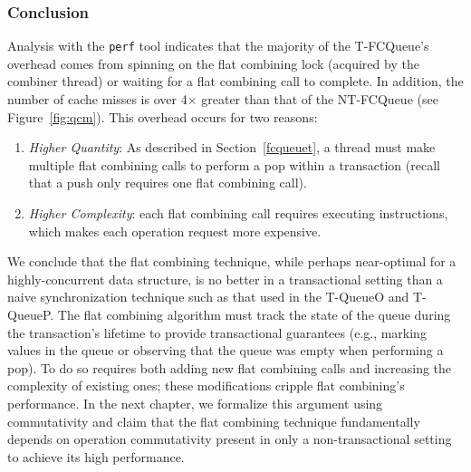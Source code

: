 \subsubsection{Conclusion}
Analysis with the \texttt{perf} tool indicates that the majority of the T-FCQueue's overhead comes from spinning on the flat combining lock (acquired by the combiner thread) or waiting for a flat combining call to complete. In addition, the number of cache misses is over 4$\times$ greater than that of the NT-FCQueue (see Figure~\ref{fig:qcm}). This overhead occurs for two reasons:
\begin{enumerate}
    \item \emph{Higher Quantity}: As described in Section~\ref{fcqueuet}, a thread must make multiple flat combining calls to perform a pop within a transaction (recall that a push only requires one flat combining call).
\item \emph{Higher Complexity}: each flat combining call requires executing instructions, which makes each operation request more expensive.
\end{enumerate}

We conclude that the flat combining technique, while perhaps near-optimal for a highly-concurrent data structure, is no better in a transactional setting than a naive synchronization technique such as that used in the T-QueueO and T-QueueP. The flat combining algorithm must track the state of the queue during the transaction's lifetime to provide transactional guarantees (e.g., marking values in the queue or observing that the queue was empty when performing a pop). To do so requires both adding new flat combining calls and increasing the complexity of existing ones; these modifications cripple flat combining's performance.
In the next chapter, we formalize this argument using commutativity and claim that the flat combining technique fundamentally depends on operation commutativity present in only a non-transactional setting to achieve its high performance. 


